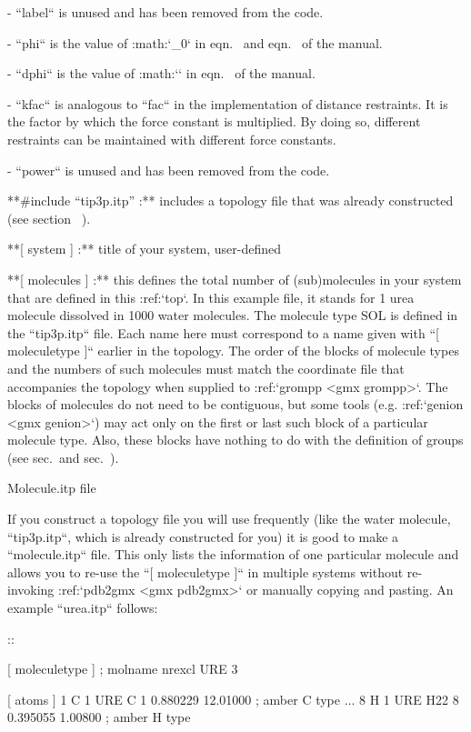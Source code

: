 -  ``label`` is unused and has been removed from the code.

-  ``phi`` is the value of :math:`\phi_0` in
   eqn. 
   and
   eqn. 
   of the manual.

-  ``dphi`` is the value of :math:`\Delta\phi` in
   eqn. 
   of the manual.

-  ``kfac`` is analogous to ``fac`` in the
   implementation of distance restraints. It is the factor by which the
   force constant is multiplied. By doing so, different restraints can
   be maintained with different force constants.

-  ``power`` is unused and has been removed from the code.

**#include “tip3p.itp” :** includes a topology file that
was already constructed (see section 
).

**[ system ] :** title of your system, user-defined

**[ molecules ] :** this defines the total number of
(sub)molecules in your system that are defined in this
:ref:`top`. In this example file, it stands for 1 urea
molecule dissolved in 1000 water molecules. The molecule type SOL is
defined in the ``tip3p.itp`` file. Each name here must
correspond to a name given with ``[ moleculetype ]`` earlier
in the topology. The order of the blocks of molecule types and the
numbers of such molecules must match the coordinate file that
accompanies the topology when supplied to
:ref:`grompp <gmx grompp>`. The blocks of
molecules do not need to be contiguous, but some tools (e.g.
:ref:`genion <gmx genion>`) may act only on the
first or last such block of a particular molecule type. Also, these
blocks have nothing to do with the definition of
groups (see
sec. and
sec. ).

Molecule.itp file
~~~~~~~~~~~~~~~~~

If you construct a topology file you will use frequently (like the water
molecule, ``tip3p.itp``, which is already constructed for
you) it is good to make a ``molecule.itp`` file. This only
lists the information of one particular molecule and allows you to
re-use the ``[ moleculetype ]`` in multiple systems without
re-invoking :ref:`pdb2gmx <gmx pdb2gmx>` or manually copying and pasting. An
example ``urea.itp`` follows:

::

    [ moleculetype ]
    ; molname	nrexcl
    URE		3

    [ atoms ]
       1  C  1  URE      C      1     0.880229  12.01000   ; amber C  type
    ...
       8  H  1  URE    H22      8     0.395055   1.00800   ; amber H  type


